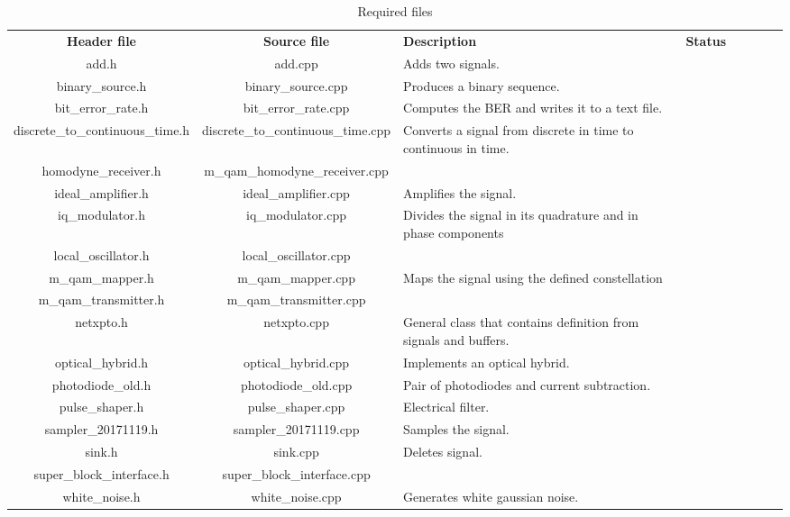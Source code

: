 \begin{table}
 	\centering
 	\caption{Required files}
 	\begin{tabular}{|c|c|p{40mm}|c|ccp{40mm}c}
 		\cline{1-4}
 		\textbf{Header file} & \textbf{Source file} & \textbf{Description} &  \textbf{Status} & \\ \cline{1-4}
 		add.h & add.cpp & Adds two signals.  & \checkmark &   \\ \cline{1-4}
 		binary\_source.h & binary\_source.cpp & Produces a binary sequence. & \checkmark & \\ \cline{1-4}
 		bit\_error\_rate.h & bit\_error\_rate.cpp & Computes the BER and writes it to a text file. & \checkmark & \\ \cline{1-4}
 		discrete\_to\_continuous\_time.h & discrete\_to\_continuous\_time.cpp & Converts a signal from discrete in time to continuous in time. & \checkmark & \\ \cline{1-4}
 		homodyne\_receiver.h & m\_qam\_homodyne\_receiver.cpp & & \\ \cline{1-4}
 		ideal\_amplifier.h & ideal\_amplifier.cpp & Amplifies the signal. & \checkmark & \\ \cline{1-4}
 		iq\_modulator.h & iq\_modulator.cpp & Divides the signal in its quadrature and in phase components & \checkmark &\\ \cline{1-4}
 		local\_oscillator.h & local\_oscillator.cpp & & & \checkmark &\\ \cline{1-4}
 		m\_qam\_mapper.h & m\_qam\_mapper.cpp & Maps the signal using the defined constellation & \checkmark & \\ \cline{1-4}
 		m\_qam\_transmitter.h & m\_qam\_transmitter.cpp & & \checkmark & \\ \cline{1-4}
 		netxpto.h & netxpto.cpp & General class that contains definition from signals and buffers. & \checkmark &\\ \cline{1-4}
 		optical\_hybrid.h & optical\_hybrid.cpp & Implements an optical hybrid. & \checkmark & \\ \cline{1-4}
 		photodiode\_old.h & photodiode\_old.cpp & Pair of photodiodes and current subtraction. & \checkmark & \\ \cline{1-4}
 		pulse\_shaper.h & pulse\_shaper.cpp & Electrical filter. & \checkmark &\\ \cline{1-4}
 		sampler\_20171119.h & sampler\_20171119.cpp & Samples the signal. & \checkmark &\\ \cline{1-4}
 		sink.h & sink.cpp & Deletes signal. & \checkmark & \\ \cline{1-4}
 		super\_block\_interface.h & super\_block\_interface.cpp & & \checkmark &\\ \cline{1-4}
 		white\_noise.h & white\_noise.cpp & Generates white gaussian noise. & \checkmark &\\ \cline{1-4}
 	\end{tabular}
 	\label{table:files}
\end{table}

